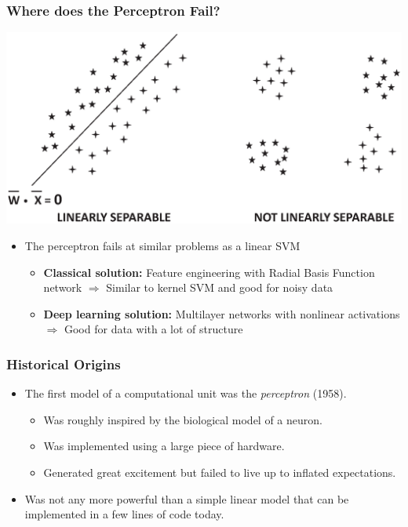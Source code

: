 \documentclass[aspectratio=169,mathserif]{beamer}
\begin{document}
\begin{frame}
\frametitle{Where does the Perceptron Fail?}
\begin{center}
\includegraphics[scale=0.4]{separable.eps}
\end{center}
\begin{itemize}
\item The perceptron fails at similar problems as a linear SVM
\begin{itemize}
\item {\bf Classical solution:} Feature engineering with
Radial Basis Function network $\Rightarrow$ Similar to kernel SVM
and good for noisy data
\item {\bf Deep learning solution:} Multilayer networks with
nonlinear activations $\Rightarrow$ Good for data with a lot of
structure
\end{itemize}
\end{itemize}
\end{frame}




\begin{frame}
\frametitle{Historical Origins}
\begin{itemize}
\item The first  model of a computational unit was the {\em
perceptron} (1958).
\begin{itemize}
\item Was roughly inspired by the biological model of a neuron.
\item Was implemented using a large piece of hardware.
\item Generated great excitement but failed to live up to inflated expectations.
\end{itemize}
\item Was not any more powerful than a simple linear model that can
be implemented in a  few lines of code today.
\end{itemize}
\end{frame}
\end{document}
